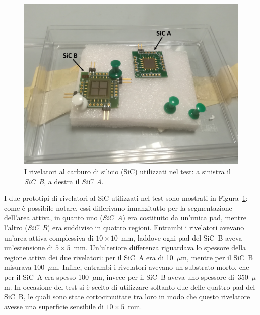 \vspace{0.5 cm}


\subsection{}

\begin{figure} [!p]
	\centering
	\includegraphics[width=\textwidth, keepaspectratio]{Grafici/sic_etichette.png}
	\caption{I rivelatori al carburo di silicio (SiC) utilizzati nel test: a sinistra il \emph{SiC~B}, a destra il \emph{SiC~A}.} \label{fig:sic}
\end{figure}

I due prototipi di rivelatori al SiC utilizzati nel test sono mostrati in Figura~\ref{fig:sic}: come è possibile notare, essi differivano innanzitutto per la segmentazione dell'area attiva, in quanto uno (\emph{SiC~A}) era costituito da un'unica pad, mentre l'altro (\emph{SiC~B}) era suddiviso in quattro regioni. 
Entrambi i rivelatori avevano un'area attiva complessiva di $10 \times 10$~mm, laddove ogni pad del SiC~B aveva un'estensione di $5 \times 5$~mm.
Un'ulteriore differenza riguardava lo spessore della regione attiva dei due rivelatori: per il SiC~A era di 10~$\mu$m, mentre per il SiC~B misurava 100~$\mu$m.
Infine, entrambi i rivelatori avevano un substrato morto, che per il SiC~A era spesso 100~$\mu$m, invece per il SiC~B aveva uno spessore di~350~$\mu$m.
In occasione del test si è scelto di utilizzare soltanto due delle quattro pad del SiC~B, le quali sono state cortocircuitate tra loro in modo che questo rivelatore avesse una superficie sensibile di $10 \times 5$~mm.





